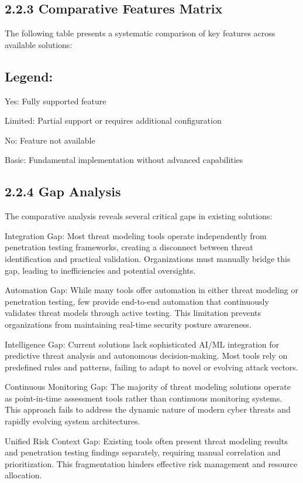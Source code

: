 \documentclass[12pt,a4paper]{report}
\begin{document}
\subsection{2.2.3 Comparative Features Matrix}

The following table presents a systematic comparison of key features across available solutions:

\subsection{Legend:}

Yes: Fully supported feature

Limited: Partial support or requires additional configuration

No: Feature not available

Basic: Fundamental implementation without advanced capabilities

\subsection{2.2.4 Gap Analysis}

The comparative analysis reveals several critical gaps in existing solutions:

Integration Gap: Most threat modeling tools operate independently from penetration testing frameworks, creating a disconnect between threat identification and practical validation. Organizations must manually bridge this gap, leading to inefficiencies and potential oversights.

Automation Gap: While many tools offer automation in either threat modeling or penetration testing, few provide end-to-end automation that continuously validates threat models through active testing. This limitation prevents organizations from maintaining real-time security posture awareness.

Intelligence Gap: Current solutions lack sophisticated AI/ML integration for predictive threat analysis and autonomous decision-making. Most tools rely on predefined rules and patterns, failing to adapt to novel or evolving attack vectors.

Continuous Monitoring Gap: The majority of threat modeling solutions operate as point-in-time assessment tools rather than continuous monitoring systems. This approach fails to address the dynamic nature of modern cyber threats and rapidly evolving system architectures.

Unified Risk Context Gap: Existing tools often present threat modeling results and penetration testing findings separately, requiring manual correlation and prioritization. This fragmentation hinders effective risk management and resource allocation.
\end{document}
